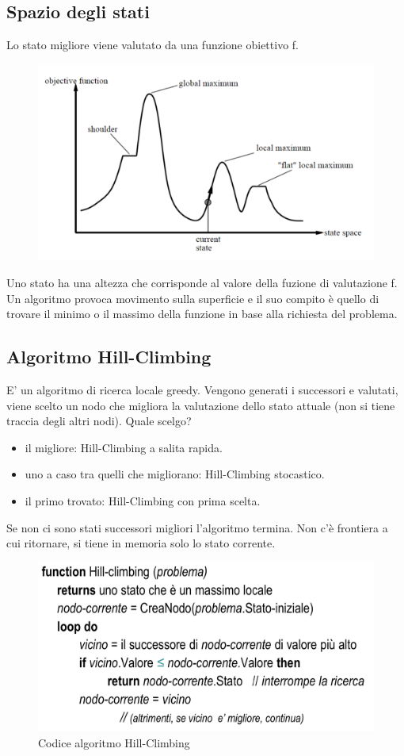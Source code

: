 \documentclass{article}
\begin{document}
\subsection{Spazio degli stati}
Lo stato migliore viene valutato da una funzione obiettivo f.
\begin{figure}[H]
    \centering
    \includegraphics[scale=0.5]{Images/spaziodeglistatilocali.png}
\end{figure}
Uno stato ha una altezza che corrisponde al valore della fuzione di valutazione f. Un algoritmo provoca movimento sulla superficie e il suo compito è quello di trovare il minimo o il massimo della funzione in base alla richiesta del problema.

\subsection{Algoritmo Hill-Climbing}
E' un algoritmo di ricerca locale greedy. Vengono generati i successori e valutati, viene scelto un nodo che migliora la valutazione dello stato attuale (non si tiene traccia degli altri nodi). Quale scelgo?
\begin{itemize}
    \item il migliore: Hill-Climbing a salita rapida.
    \item uno a caso tra quelli che migliorano: Hill-Climbing stocastico.
    \item il primo trovato: Hill-Climbing con prima scelta.
\end{itemize}
Se non ci sono stati successori migliori l'algoritmo termina. Non c'è frontiera a cui ritornare, si tiene in memoria solo lo stato corrente.
\begin{figure}[H]
    \centering
    \includegraphics[scale=0.4]{Images/hillclimbing.png}
    \caption{Codice algoritmo Hill-Climbing}
\end{figure}
\end{document}

